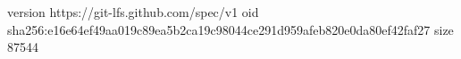 version https://git-lfs.github.com/spec/v1
oid sha256:e16e64ef49aa019c89ea5b2ca19c98044ce291d959afeb820e0da80ef42faf27
size 87544

